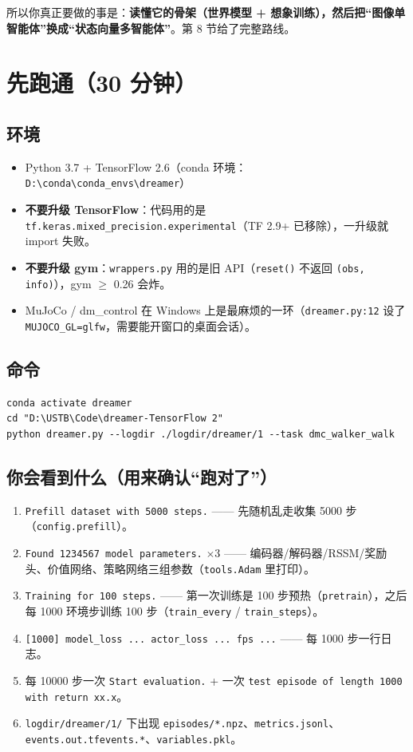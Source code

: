 \documentclass[11pt]{ctexart}
\begin{document}
所以你真正要做的事是：\textbf{读懂它的骨架（世界模型 + 想象训练），然后把``图像单智能体''换成``状态向量多智能体''}。第 8 节给了完整路线。

\section{先跑通（30 分钟）}

\subsection{环境}
\begin{itemize}
  \item Python 3.7 + TensorFlow 2.6（conda 环境：\texttt{D:\textbackslash conda\textbackslash conda\_envs\textbackslash dreamer}）
  \item \textbf{不要升级 TensorFlow}：代码用的是 \texttt{tf.keras.mixed\_precision.experimental}（TF 2.9+ 已移除），一升级就 import 失败。
  \item \textbf{不要升级 gym}：\texttt{wrappers.py} 用的是旧 API（\texttt{reset()} 不返回 \texttt{(obs, info)}），gym $\geq$ 0.26 会炸。
  \item MuJoCo / dm\_control 在 Windows 上是最麻烦的一环（\texttt{dreamer.py:12} 设了 \texttt{MUJOCO\_GL=glfw}，需要能开窗口的桌面会话）。
\end{itemize}

\subsection{命令}
\begin{Verbatim}[frame=single,fontsize=\small]
conda activate dreamer
cd "D:\USTB\Code\dreamer-TensorFlow 2"
python dreamer.py --logdir ./logdir/dreamer/1 --task dmc_walker_walk
\end{Verbatim}

\subsection{你会看到什么（用来确认``跑对了''）}
\begin{enumerate}
  \item \texttt{Prefill dataset with 5000 steps.} —— 先随机乱走收集 5000 步（\texttt{config.prefill}）。
  \item \texttt{Found 1234567 model parameters.} $\times$3 —— 编码器/解码器/RSSM/奖励头、价值网络、策略网络三组参数（\texttt{tools.Adam} 里打印）。
  \item \texttt{Training for 100 steps.} —— 第一次训练是 100 步预热（\texttt{pretrain}），之后每 1000 环境步训练 100 步（\texttt{train\_every} / \texttt{train\_steps}）。
  \item \texttt{[1000] model\_loss ... actor\_loss ... fps ...} —— 每 1000 步一行日志。
  \item 每 10000 步一次 \texttt{Start evaluation.} + 一次 \texttt{test episode of length 1000 with return xx.x}。
  \item \texttt{logdir/dreamer/1/} 下出现 \texttt{episodes/*.npz}、\texttt{metrics.jsonl}、\texttt{events.out.tfevents.*}、\texttt{variables.pkl}。
\end{enumerate}
\end{document}
